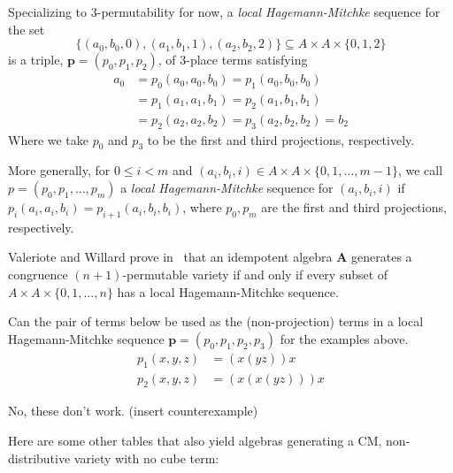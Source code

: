 \begin{example}
\vskip3mm
Specializing to $3$-permutability for now, a \emph{local Hagemann-Mitchke} sequence for the set 
\[\{(a_0, b_0, 0), (a_1, b_1, 1) , (a_2, b_2, 2) \} \subseteq A \times A \times \{0,1,2\}\] is a triple, $\mathbf p = (p_0, p_1, p_2)$, of 3-place terms satisfying
\begin{align}
a_0 &= p_0(a_0, a_0, b_0) =p_1(a_0, b_0, b_0) \nonumber\\
    &= p_1(a_1, a_1, b_1) =p_2(a_1, b_1, b_1) \nonumber\\
    &= p_2(a_2, a_2, b_2) =p_3(a_2, b_2, b_2) = b_2 \nonumber
\end{align}
Where we take $p_0$ and $p_3$ to be the first and third projections, respectively.

\end{example}

More generally, for $0\leq i < m$ and
$(a_i, b_i, i)\in A \times A \times \{0,1,\dots,m-1\}$,
we call $p = (p_0, p_1, \dots, p_m)$ a \emph{local Hagemann-Mitchke} sequence for 
$(a_i, b_i, i)$ if $p_i(a_i, a_i, b_i) = p_{i+1}(a_i, b_i, b_i)$, where $p_0, p_m$ are the first and third projections, respectively.

Valeriote and Willard prove in~\cite{MR3239624} that an idempotent algebra $\mathbf{A}$ generates a congruence $(n+1)$-permutable variety if and only if every subset
of $A \times A \times \{0, 1, \dots, n\}$ has a local Hagemann-Mitchke sequence.

\newpage

 Can the pair of terms below be used as the (non-projection) terms in a local Hagemann-Mitchke sequence $\mathbf p = (p_0, p_1, p_2, p_3)$ for the examples above.
\begin{align}
p_1(x,y,z) &= (x (y z) )x\nonumber\\
p_2(x,y,z) &= (x (x (y z)) )x\nonumber
\end{align}

 No, these don't work. (insert counterexample)

Here are some other tables that also yield algebras generating a CM, non-distributive variety with no cube term:

